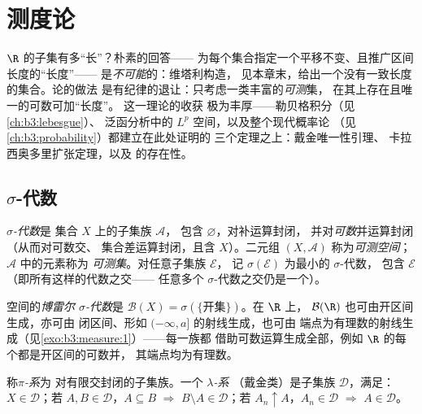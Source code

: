 \chapter{测度论}\label{ch:b3:measure}

$\R$ 的子集有多“长”？朴素的回答——
为每个集合指定一个平移不变、且推广区间长度的“长度”——
是\emph{不可能}的：维塔利构造，
见本章末，给出一个没有一致长度的集合。论的做法
是有纪律的退让：只考虑一类丰富的\emph{可测}集，
在其上存在且唯一的可数可加“长度”。
这一理论的收获
极为丰厚——勒贝格积分（见\cref{ch:b3:lebesgue}）、
泛函分析中的 $L^p$ 空间，以及整个现代概率论
（见\cref{ch:b3:probability}）都建立在此处证明的
三个定理之上：戴金唯一性引理、
卡拉西奥多里扩张定理，以及
的存在性。

\section{$\sigma$-代数}

\begin{definition}\label{def:b3:measure:sigmaalgebra}
\emph{$\sigma$-代数}是
集合 $X$ 上的子集族 $\mathcal A$，
包含 $\varnothing$，对补运算封闭，
并对\emph{可数}并运算封闭（从而对可数交、
集合差运算封闭，且含 $X$）。二元组 $(X, \mathcal A)$
称为\emph{可测空间}；$\mathcal A$ 中的元素称为
\emph{可测集}。对任意子集族 $\mathcal E$，
记 $\sigma(\mathcal E)$ 为最小的 $\sigma$-代数，
包含 $\mathcal E$（即所有这样的代数之交——
任意多个 $\sigma$-代数之交仍是一个）。
\end{definition}

\begin{definition}\label{def:b3:measure:borel}
空间的\emph{博雷尔 $\sigma$-代数}是
$\mathcal B(X) = \sigma(\{\text{开集}\})$。在 $\R$ 上，
$\mathcal B(\R)$ 也可由开区间生成，亦可由
闭区间、形如 $(-\infty, a]$ 的射线生成，也可由
端点为有理数的射线生成（见\cref{exo:b3:measure:1}）——每一族都
借助可数运算生成全部，例如
$\R$ 的每个都是开区间的可数并，
其端点均为有理数。
\end{definition}

\begin{definition}\label{def:b3:measure:dynkin}
称\emph{$\pi$-系}为
对有限交封闭的子集族。一个
\emph{$\lambda$-系}
（戴金类）是子集族 $\mathcal D$，满足：$X \in \mathcal
D$；若 $A, B \in \mathcal D$，$A \subseteq B$ $\Rightarrow$ $B
\setminus A \in \mathcal D$；若 $A_n \uparrow A$，$A_n \in
\mathcal D$ $\Rightarrow$ $A \in \mathcal D$。
\end{definition}

